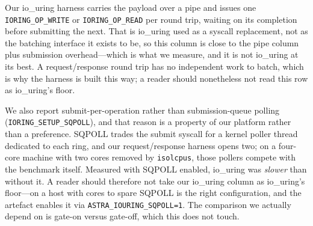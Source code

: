  Our io\_uring harness carries the
payload over a pipe and issues one \texttt{IORING\_OP\_WRITE} or
\texttt{IORING\_OP\_READ} per round trip, waiting on its completion
before submitting the next. That is io\_uring used as a syscall
replacement, not as the batching interface it exists to be, so this
column is close to the pipe column plus submission overhead---which is
what we measure, and it is not io\_uring at its best. A request/response
round trip has no independent work to batch, which is why the harness
is built this way; a reader should nonetheless not read this row as
io\_uring's floor.

We also report submit-per-operation rather than submission-queue
polling (\texttt{IORING\_SETUP\_SQPOLL}), and that reason is a property
of our platform rather than a preference. SQPOLL trades the submit syscall
for a kernel poller thread dedicated to each ring, and our
request/response harness opens two; on a four-core machine with two
cores removed by \texttt{isolcpus}, those pollers compete with the
benchmark itself. Measured with SQPOLL enabled, io\_uring was
\emph{slower} than without it. A reader should therefore not take our
io\_uring column as io\_uring's floor---on a host with cores to spare
SQPOLL is the right configuration, and the artefact enables it via
\texttt{ASTRA\_IOURING\_SQPOLL=1}. The comparison we actually depend
on is gate-on versus gate-off, which this does not touch.
